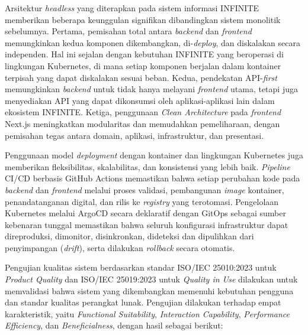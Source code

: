 Arsitektur \textit{headless} yang diterapkan pada sistem informasi INFINITE memberikan beberapa keunggulan signifikan dibandingkan sistem monolitik sebelumnya. Pertama, pemisahan total antara \textit{backend} dan \textit{frontend} memungkinkan kedua komponen dikembangkan, di-\textit{deploy}, dan diskalakan secara independen. Hal ini sejalan dengan kebutuhan INFINITE yang beroperasi di lingkungan Kubernetes, di mana setiap komponen berjalan dalam kontainer terpisah yang dapat diskalakan sesuai beban. Kedua, pendekatan API-\textit{first} memungkinkan \textit{backend} untuk tidak hanya melayani \textit{frontend} utama, tetapi juga menyediakan API yang dapat dikonsumsi oleh aplikasi-aplikasi lain dalam ekosistem INFINITE. Ketiga, penggunaan \textit{Clean Architecture} pada \textit{frontend} Next.js meningkatkan modularitas dan memudahkan pemeliharaan, dengan pemisahan tegas antara domain, aplikasi, infrastruktur, dan presentasi.

Penggunaan model \textit{deployment} dengan kontainer dan lingkungan Kubernetes juga memberikan fleksibilitas, skalabilitas, dan konsistensi yang lebih baik. \textit{Pipeline} CI/CD berbasis GitHub Actions memastikan bahwa setiap perubahan kode pada \textit{backend} dan \textit{frontend} melalui proses validasi, pembangunan \textit{image} kontainer, penandatanganan digital, dan rilis ke \textit{registry} yang terotomasi.  Pengelolaan Kubernetes melalui ArgoCD secara deklaratif dengan GitOps sebagai sumber kebenaran tunggal memastikan bahwa seluruh konfigurasi infrastruktur dapat direproduksi, dimonitor, disinkronkan, dideteksi dan dipulihkan dari penyimpangan (\textit{drift}), serta dilakukan \textit{rollback} secara otomatis.

Pengujian kualitas sistem berdasarkan standar ISO/IEC 25010:2023 untuk \textit{Product Quality} dan ISO/IEC 25019:2023 untuk \textit{Quality in Use} dilakukan untuk memvalidasi bahwa sistem yang dikembangkan memenuhi kebutuhan pengguna dan standar kualitas perangkat lunak. Pengujian dilakukan terhadap empat karakteristik, yaitu \textit{Functional Suitability}, \textit{Interaction Capability}, \textit{Performance Efficiency}, dan \textit{Beneficialness}, dengan hasil sebagai berikut:

